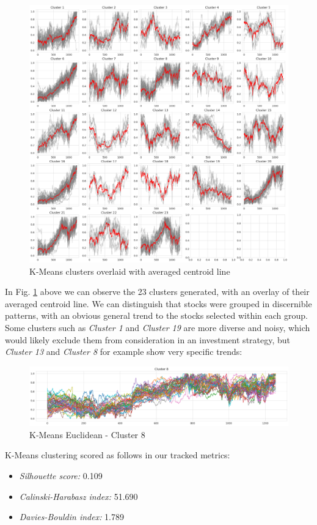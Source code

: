 \documentclass[11pt]{article}
\begin{document}
\begin{figure}[H]
\centering
\includegraphics[width=12cm]{img/kmeans-euclidean-average.png} 
\caption{K-Means clusters overlaid with averaged centroid line}
\label{fig:kmeans_average}
\end{figure}

In Fig. \ref{fig:kmeans_average} above we can observe the 23 clusters generated, with an overlay of their averaged centroid line. We can distinguish that stocks were grouped in discernible patterns, with an obvious general trend to the stocks selected within each group. Some clusters such as \textit{Cluster 1} and \textit{Cluster 19} are more diverse and noisy, which would likely exclude them from consideration in an investment strategy, but \textit{Cluster 13} and \textit{Cluster 8} for example show very specific trends:

\begin{figure}[H]
\centering
\includegraphics[width=12cm]{img/euclidean-cluster8.png} 
\caption{K-Means Euclidean - Cluster 8}
\label{fig:kmeans_c8}
\end{figure}

K-Means clustering scored as follows in our tracked metrics:
\begin{itemize}
    \item \textit{Silhouette score:} 0.109
    \item \textit{Calinski-Harabasz index:} 51.690
    \item \textit{Davies-Bouldin index:} 1.789
\end{itemize}
\end{document}
